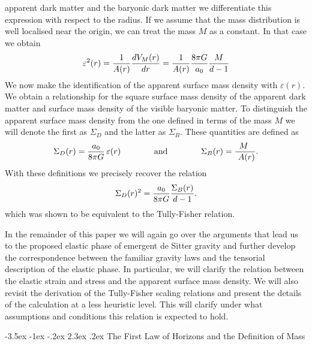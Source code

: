 \documentclass[a4paper,12pt]{article}
\makeatletter
\renewcommand\section{\@startsection {section}{1}{\z@}%
                                   {-3.5ex \@plus -1ex \@minus -.2ex}%
                                   {2.3ex \@plus.2ex}%
                                   {\normalfont\large\bfseries}}
\makeatother
\begin{document}
apparent dark matter and the baryonic dark matter we differentiate this expression with respect to the 
radius.  If we assume that the mass distribution is well localised near the origin,  we can treat the mass 
$M$ as a constant. In that case we obtain
\begin{equation}
\varepsilon^2(r) =
{1\over A(r)} {dV_M(r)\over dr}  = {1\over A(r)} {8\pi G \over a_0} {M\over {d-1}}
\end{equation}
We now make the identification of the apparent surface mass density with $\varepsilon(r)$. We obtain
a relationship for the square surface mass density of the apparent dark matter and surface mass density 
of the visible baryonic matter. To distinguish the apparent surface mass density from the one defined in terms of the mass $M$ we will denote the first as $\Sigma_D$ and the latter as $\Sigma_B$. These quantities are defined as
\begin{equation}
\Sigma_D(r) = {a_0\over 8\pi G} \,\varepsilon(r) \qquad \qquad \mbox{and}\qquad \qquad \Sigma_B(r) = {\! M\,\over \ A(r)} .
\end{equation}
With these definitions we precisely recover the relation
\begin{equation}
\Sigma_{D}(r)^2 = {a_0\over 8\pi G} {\Sigma_B (r)\over d-1}	 .
\end{equation}
which was shown to be equivalent to the Tully-Fisher relation. 
 
 In the remainder of this paper we will again go over the arguments that lead us to the proposed elastic phase of emergent de Sitter gravity and further develop the correspondence between the familiar gravity laws and the tensorial description of the elastic phase. In particular, we will clarify the relation between the elastic strain and stress and the apparent surface mass density. We will also revisit the derivation of the Tully-Fisher scaling relations and present the details of the calculation at a less heuristic level. This will clarify under what assumptions and   conditions this relation is expected to hold. 





\section{The First Law of Horizons and the Definition of Mass}
\setcounter{equation}{0}
\end{document}

